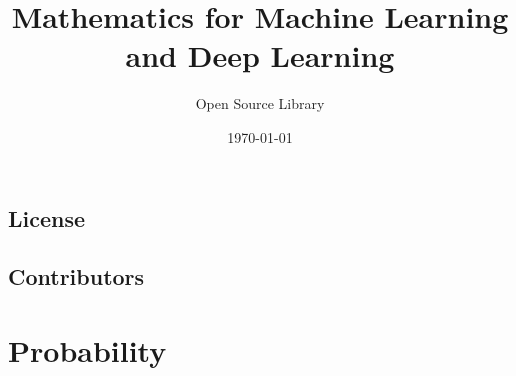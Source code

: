 \documentclass[11pt,a4paper]{book}
\begin{document}
\frontmatter
\title{Mathematics for Machine Learning and Deep Learning}
\author{Open Source Library}
\date{\today}
\maketitle

\tableofcontents

\mainmatter{}

\chapter*{License}


\chapter*{Contributors}


\part{Probability}

\end{document}
